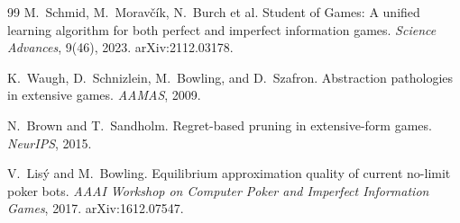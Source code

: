\documentclass[11pt]{article}
\theoremstyle{plain}
\theoremstyle{definition}
\theoremstyle{remark}
\begin{document}
\begin{thebibliography}{99}
 M.~Schmid, M.~Morav\v{c}\'ik, N.~Burch et al. Student
  of Games: A unified learning algorithm for both perfect and
  imperfect information games. \emph{Science Advances}, 9(46), 2023.
  arXiv:2112.03178.

 K.~Waugh, D.~Schnizlein, M.~Bowling, and
  D.~Szafron. Abstraction pathologies in extensive games.
  \emph{AAMAS}, 2009.

 N.~Brown and T.~Sandholm. Regret-based
  pruning in extensive-form games. \emph{NeurIPS}, 2015.

 V.~Lis\'y and M.~Bowling. Equilibrium
  approximation quality of current no-limit poker bots. \emph{AAAI
  Workshop on Computer Poker and Imperfect Information Games}, 2017.
  arXiv:1612.07547.

\end{thebibliography}
\end{document}
